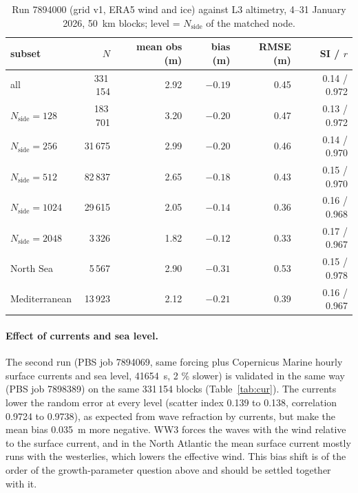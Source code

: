 \documentclass[11pt,a4paper]{article}
\newcommand{\nside}{N_{\mathrm{side}}}
\begin{document}
\begin{table}[H]
\centering\small
\begin{tabular}{lrrrrr}
\toprule
subset & $N$ & mean obs (m) & bias (m) & RMSE (m) & SI / $r$ \\
\midrule
all             & 331\,154 & 2.92 & $-0.19$ & 0.45 & 0.14 / 0.972 \\
$\nside=128$    & 183\,701 & 3.20 & $-0.20$ & 0.47 & 0.13 / 0.972 \\
$\nside=256$    &  31\,675 & 2.99 & $-0.20$ & 0.46 & 0.14 / 0.970 \\
$\nside=512$    &  82\,837 & 2.65 & $-0.18$ & 0.43 & 0.15 / 0.970 \\
$\nside=1024$   &  29\,615 & 2.05 & $-0.14$ & 0.36 & 0.16 / 0.968 \\
$\nside=2048$   &   3\,326 & 1.82 & $-0.12$ & 0.33 & 0.17 / 0.967 \\
North Sea       &   5\,567 & 2.90 & $-0.31$ & 0.53 & 0.15 / 0.978 \\
Mediterranean   &  13\,923 & 2.12 & $-0.21$ & 0.39 & 0.16 / 0.967 \\
\bottomrule
\end{tabular}
\caption{Run 7894000 (grid v1, ERA5 wind and ice) against L3 altimetry,
4--31 January 2026, \SI{50}{km} blocks; level = $\nside$ of the matched
node.}
\label{tab:val}
\end{table}

\paragraph{Effect of currents and sea level.} The second run (PBS job
7894069, same forcing plus Copernicus Marine hourly surface currents and
sea level, \SI{41654}{s}, 2 \% slower) is validated in the same way (PBS
job 7898389) on the same 331\,154 blocks (Table~\ref{tab:cur}). The
currents lower the random error at every level (scatter index 0.139 to
0.138, correlation 0.9724 to 0.9738), as expected from wave refraction by
currents, but make the mean bias \SI{0.035}{m} more negative. WW3 forces
the waves with the wind relative to the surface current, and in the
North Atlantic the mean surface current mostly runs with the westerlies,
which lowers the effective wind. This bias shift is of the order of the
growth-parameter question above and should be settled together with it.
\end{document}
